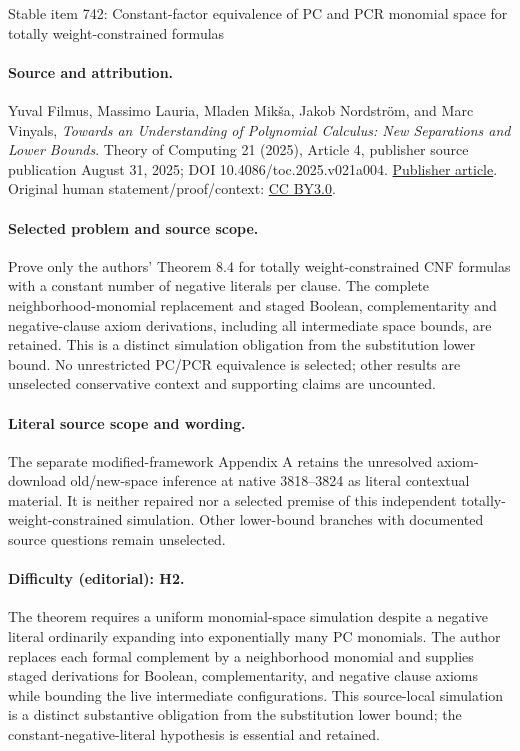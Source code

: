 \documentclass[11pt]{article}
\numberwithin{equation}{section}
\theoremstyle{definition}
\theoremstyle{plain}
\theoremstyle{plain}
\theoremstyle{definition}
\begin{document}
\begin{center}{\Large Stable item 742: Constant-factor equivalence of PC and PCR monomial space for totally weight-constrained formulas}\end{center}
\paragraph{Source and attribution.}
Yuval Filmus, Massimo Lauria, Mladen Mikša, Jakob Nordström, and Marc Vinyals, \emph{Towards an Understanding of Polynomial Calculus: New Separations and Lower Bounds}. Theory of Computing 21 (2025), Article 4, publisher source publication August 31, 2025; DOI 10.4086/toc.2025.v021a004. \href{https://theoryofcomputing.org/articles/v021a004/}{Publisher article}. Original human statement/proof/context: \href{https://creativecommons.org/licenses/by/3.0/}{CC BY3.0}.
\paragraph{Selected problem and source scope.}
Prove only the authors' Theorem 8.4 for totally weight-constrained CNF formulas with a constant number of negative literals per clause. The complete neighborhood-monomial replacement and staged Boolean, complementarity and negative-clause axiom derivations, including all intermediate space bounds, are retained. This is a distinct simulation obligation from the substitution lower bound. No unrestricted PC/PCR equivalence is selected; other results are unselected conservative context and supporting claims are uncounted.
\paragraph{Literal source scope and wording.}
The separate modified-framework Appendix A retains the unresolved axiom-download old/new-space inference at native 3818–3824 as literal contextual material. It is neither repaired nor a selected premise of this independent totally-weight-constrained simulation. Other lower-bound branches with documented source questions remain unselected.
\paragraph{Difficulty (editorial): H2.}
The theorem requires a uniform monomial-space simulation despite a negative literal ordinarily expanding into exponentially many PC monomials. The author replaces each formal complement by a neighborhood monomial and supplies staged derivations for Boolean, complementarity, and negative clause axioms while bounding the live intermediate configurations. This source-local simulation is a distinct substantive obligation from the substitution lower bound; the constant-negative-literal hypothesis is essential and retained.
\end{document}
